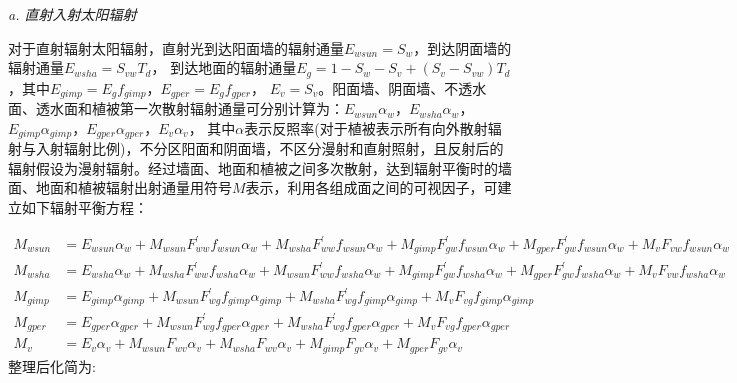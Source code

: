 \textit{a. 直射入射太阳辐射}

对于直射辐射太阳辐射，直射光到达阳面墙的辐射通量$E_{wsun}=S_w$，到达阴面墙的辐射通量$E_{wsha}=S_{vw}T_d$，
到达地面的辐射通量$E_g=1-S_w-S_v+\left(S_v-S_{vw}\right)T_d$，其中$E_{gimp}=E_gf_{gimp}$，$E_{gper}=E_gf_{gper}$，
$E_v=S_v$。阳面墙、阴面墙、不透水面、透水面和植被第一次散射辐射通量可分别计算为：$E_{wsun}\alpha_w$，$E_{wsha}\alpha_w$，
$E_{gimp}\alpha_{gimp}$，$E_{gper}\alpha_{gper}$，$E_v\alpha_v$，
其中$\alpha$表示反照率(对于植被表示所有向外散射辐射与入射辐射比例)，不分区阳面和阴面墙，不区分漫射和直射照射，且反射后的辐射假设为漫射辐射。经过墙面、地面和植被之间多次散射，达到辐射平衡时的墙面、地面和植被辐射出射通量用符号$M$表示，利用各组成面之间的可视因子，可建立如下辐射平衡方程：
\begin{landscape}
\begin{equation}
\begin{aligned}M_{wsun} &=E_{wsun} \alpha_{w}+M_{wsun} F_{ww}^{\prime} f_{wsun} \alpha_{w}+M_{wsha} F_{ww}^{\prime} f_{wsun} \alpha_{w}+M_{gimp} F_{g w}^{\prime} f_{wsun} \alpha_{w}+M_{gper} F_{g w}^{\prime} f_{wsun} \alpha_{w}+M_{v} F_{v w} f_{wsun} \alpha_{w} \\ M_{wsha} &=E_{wsha} \alpha_{w}+M_{wsha} F_{ww}^{\prime} f_{wsha} \alpha_{w}+M_{wsun} F_{ww}^{\prime} f_{wsha} \alpha_{w}+M_{gimp} F_{g w}^{\prime} f_{wsha} \alpha_{w}+M_{gper} F_{g w}^{\prime} f_{wsha} \alpha_{w}+M_{v} F_{v w} f_{wsha} \alpha_{w} \\ M_{gimp} &=E_{gimp} \alpha_{gimp}+M_{wsun} F_{w g}^{\prime} f_{gimp} \alpha_{gimp}+M_{wsha} F_{w g}^{\prime} f_{gimp} \alpha_{gimp}+M_{v} F_{v g} f_{gimp} \alpha_{gimp} \\ M_{gper} &=E_{gper} \alpha_{gper}+M_{wsun} F_{w g}^{\prime} f_{gper} \alpha_{gper}+M_{wsha} F_{w g}^{\prime} f_{gper} \alpha_{gper}+M_{v} F_{v g} f_{gper} \alpha_{gper} \\ M_{v} &=E_{v} \alpha_{v}+M_{wsun} F_{w v} \alpha_{v}+M_{wsha} F_{w v} \alpha_{v}+M_{gimp} F_{g v} \alpha_{v}+M_{gper} F_{g v} \alpha_{v}\end{aligned}
\end{equation}
整理后化简为:
\begin{equation}

\end{equation}
\end{landscape}
